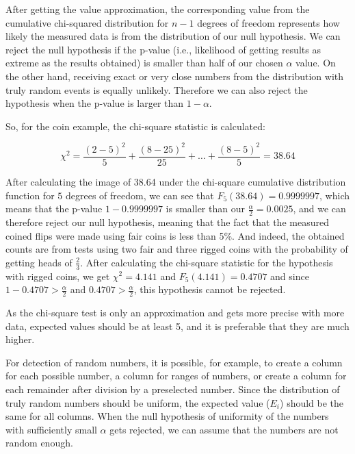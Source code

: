 \documentclass[
  digital, %
  color,   %
  oneside, %
  lof,     %
  nolot,     %
]{fithesis4}
\begin{document}
After getting the value approximation, the corresponding value from the cumulative chi-squared distribution for $n - 1$ degrees of freedom represents how likely the measured data is from the distribution of our null hypothesis.
We can reject the null hypothesis if the p-value (i.e., likelihood of getting results as extreme as the results obtained) is smaller than half of our chosen $\alpha$ value.
On the other hand, receiving exact or very close numbers from the distribution with truly random events is equally unlikely.
Therefore we can also reject the hypothesis when the p-value is larger than $1 - \alpha$.\cite{knuth81}

So, for the coin example, the chi-square statistic is calculated:

\begin{equation}
  \chi^2 = \frac{(2 - 5)^2}{5} + \frac{(8 - 25)^2}{25} + \dots + \frac{(8 - 5)^2}{5} = 38.64
  \label{eq:chi2-statistic-example}
\end{equation}

After calculating the image of 38.64 under the chi-square cumulative distribution function for $5$ degrees of freedom, we can see that $F_5(38.64) = 0.9999997$, which means that the p-value $1 - 0.9999997$ is smaller than our $\frac{\alpha}{2} = 0.0025$, and we can therefore reject our null hypothesis, meaning that the fact that the measured coined flips were made using fair coins is less than 5\%.
And indeed, the obtained counts are from tests using two fair and three rigged coins with the probability of getting heads of $\frac{2}{3}$.
After calculating the chi-square statistic for the hypothesis with rigged coins, we get $\chi^2 = 4.141$ and $F_5(4.141) = 0.4707$ and since $1 - 0.4707 > \frac{\alpha}{2}$ and $0.4707 > \frac{\alpha}{2}$, this hypothesis cannot be rejected.

As the chi-square test is only an approximation and gets more precise with more data, expected values should be at least 5, and it is preferable that they are much higher.\cite{knuth81}

For detection of random numbers, it is possible, for example, to create a column for each possible number, a column for ranges of numbers, or create a column for each remainder after division by a preselected number.
Since the distribution of truly random numbers should be uniform, the expected value ($E_i$) should be the same for all columns.
When the null hypothesis of uniformity of the numbers with sufficiently small $\alpha$ gets rejected, we can assume that the numbers are not random enough.
\end{document}
